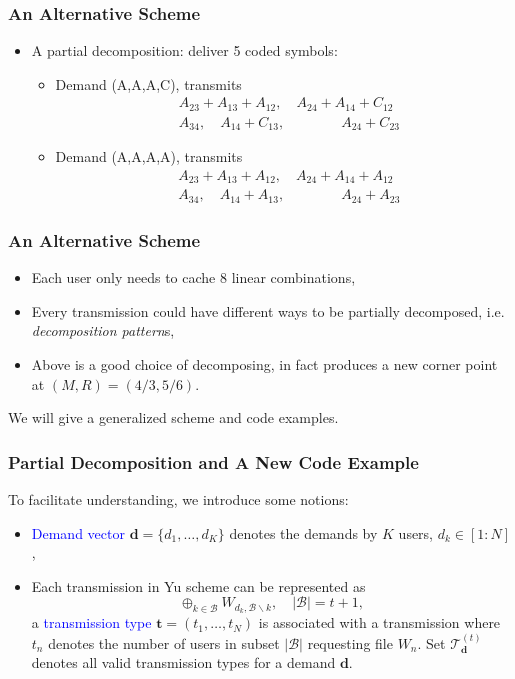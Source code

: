 \documentclass{beamer}
\begin{document}
\begin{frame}
\frametitle{An Alternative Scheme}

\begin{itemize}
\item A partial decomposition: deliver 5 coded symbols:
	\begin{itemize}
	[circle]
	\item Demand (A,A,A,C), transmits
	\begin{align*}
	& A_{23} +A_{13}+A_{12}, \quad  A_{24} +A_{14}+C_{12} \\
	& A_{34}, \quad A_{14}+C_{13} ,\qquad \qquad A_{24}+C_{23}
	\end{align*}
	\item Demand (A,A,A,A), transmits
	\begin{align*}
	& A_{23} +A_{13}+A_{12}, \quad  A_{24} +A_{14}+A_{12} \\
	& A_{34}, \quad A_{14}+A_{13} ,\qquad \qquad A_{24}+A_{23}
	\end{align*}
	\end{itemize}
\end{itemize}
\end{frame}


\begin{frame}
\frametitle{An Alternative Scheme}
\begin{itemize}
\item Each user only needs to cache 8 linear combinations,
\item Every transmission could have different ways to be partially decomposed, i.e. \textit{decomposition pattern}s,
\item Above is a good choice of decomposing, in fact produces a new corner point at $(M,R)=(4/3,5/6)$.
\end{itemize}
We will give a generalized scheme and code examples.
\end{frame}

\begin{frame}
\frametitle{Partial Decomposition and A New Code Example}
To facilitate understanding, we introduce some notions:
\begin{itemize}
\item \textcolor{blue}{Demand vector} $\boldsymbol{d}=\{d_1,\ldots,d_K\}$ denotes the demands by $K$ users, $d_k \in [1:N]$,
\item Each transmission in Yu scheme can be represented as 
\begin{equation*}
\oplus_{k \in \mathcal{B}}W_{d_k,\mathcal{B} \backslash k},  \quad |\mathcal{B}|=t+1,
\end{equation*}
a \textcolor{blue}{transmission type} $\boldsymbol{t}=(t_1,\ldots,t_N)$ is associated with a transmission where $t_n$ denotes the number of users in subset $|\mathcal{B}|$ requesting file $W_n$. Set $\mathcal{T}_{\boldsymbol{d}}^{(t)}$ denotes all valid transmission types for a demand $\boldsymbol{d}$.
\end{itemize}
\end{frame}
\end{document}
